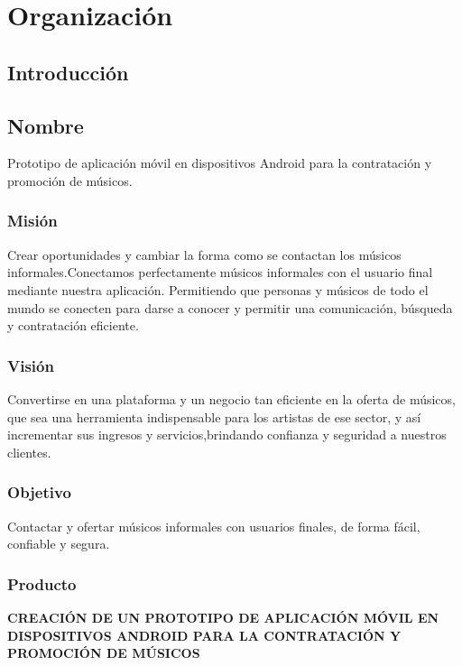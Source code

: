 \chapter{Organización}

\section{Introducción}

\section{Nombre}
Prototipo de aplicación móvil en dispositivos Android para la contratación y promoción de músicos.
\subsection{Misión}
Crear oportunidades y cambiar la forma como se contactan los músicos informales.Conectamos perfectamente músicos informales con el usuario final mediante nuestra aplicación. Permitiendo que personas y músicos de todo el mundo se conecten para darse a conocer y permitir una comunicación, búsqueda y contratación eficiente.
\subsection{Visión}
Convertirse en una plataforma y un negocio tan eficiente en la oferta de músicos, que sea una herramienta indispensable para los artistas de ese sector, y así incrementar sus ingresos y servicios,brindando confianza y seguridad a nuestros clientes.
\subsection{Objetivo}
Contactar y ofertar músicos informales con usuarios finales, de forma fácil, confiable y segura.
\newpage
\subsection{Producto}
\textbf{CREACIÓN DE UN PROTOTIPO DE APLICACIÓN MÓVIL EN 
DISPOSITIVOS ANDROID PARA LA CONTRATACIÓN Y PROMOCIÓN DE MÚSICOS}
